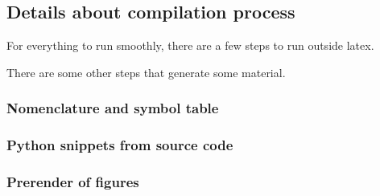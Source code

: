 \subsection{Details about compilation process}

For everything to run smoothly, there are a few steps to run outside latex.

There are some other steps that generate some material.

\subsubsection{Nomenclature and symbol table}


\subsubsection{Python snippets from source code}


\subsubsection{Prerender of figures}

